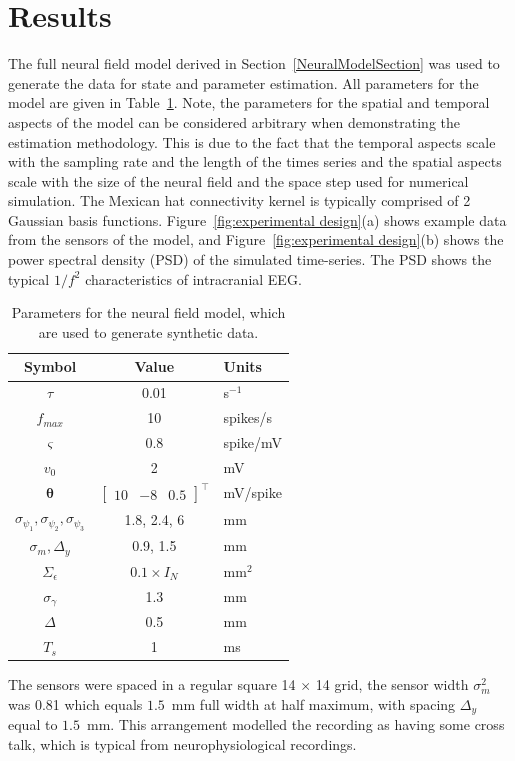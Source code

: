\documentclass[10pt,a4paper]{article}
\begin{document}
\section{Results}\label{ResultsSection} The full neural field model derived in Section~\ref{NeuralModelSection} was used to generate the data for state and parameter estimation. All parameters for the model are given in Table~\ref{tab:Model Parameters}. Note, the parameters for the spatial and temporal aspects of the model can be considered arbitrary when demonstrating the estimation methodology. This is due to the fact that the temporal aspects scale with the sampling rate and the length of the times series and the spatial aspects scale with the size of the neural field and the space step used for numerical simulation. The Mexican hat connectivity kernel is typically comprised of 2 Gaussian basis functions. Figure~\ref{fig:experimental design}(a) shows example data from the sensors of the model, and Figure~\ref{fig:experimental design}(b) shows the power spectral density (PSD) of the simulated time-series. The PSD shows the typical $1/f^2$ characteristics of intracranial EEG.
\begin{table}\footnotesize
\centering
\begin{tabular}{ccl}
	\hline\hline Symbol & Value & Units \\
	\hline\hline
	$\tau$ & 0.01 & s$^{-1}$\\
	$f_{max}$ & 10 & spikes/s \\
	$\varsigma$ & 0.8 & spike/mV\\
	$v_0$ & 2 & mV\\
	$\boldsymbol{\theta}$ & $\left[\begin{array}{ccc}
	10 &-8 &0.5
	\end{array}
	\right]^{\top}$ & mV/spike\\
	$\sigma_{\psi_{1}}, \sigma_{\psi_{2}}, \sigma_{\psi_{3}}$ & 1.8, 2.4, 6 & mm\\
	$\sigma_{m},\Delta_{y}$&0.9, 1.5&mm\\
	$\Sigma_{\epsilon}$ &$0.1 \times I_{N} $& mm$^2$ \\
	$\sigma_{\gamma}$&1.3&mm\\
	$\Delta$ & 0.5 & mm \\
	$T_s$ & 1 & ms \\ 
\end{tabular}
\caption{Parameters for the neural field model, which are used to generate synthetic data.}
\label{tab:Model Parameters}
\end{table}
The sensors were spaced in a regular square 14 $\times$ 14 grid, the sensor width $\sigma^2_m$ was 0.81 which equals $1.5$~mm full width at half maximum, with spacing $\Delta_y$ equal to $1.5$~mm. This arrangement modelled the recording as having some cross talk, which is typical from neurophysiological recordings. 
\end{document}
